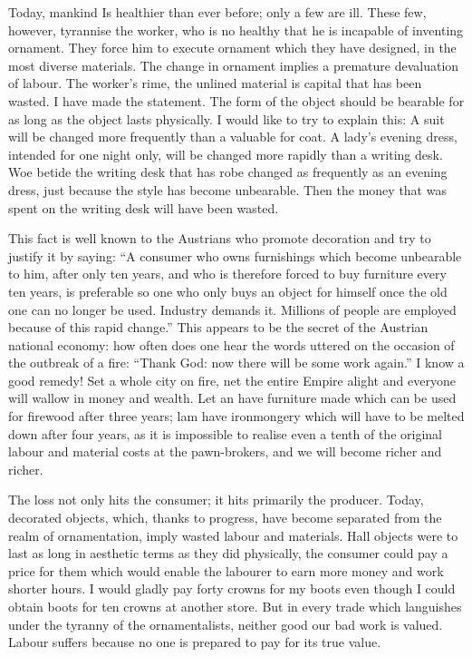 \documentclass[a4paper]{article}
\begin{document}
Today, mankind Is healthier than ever before; only a few are ill. These few, however, tyrannise the worker, who is no healthy that he is incapable of inventing ornament. They force him to execute ornament which they have designed, in the most diverse materials.
The change in ornament implies a premature devaluation of labour. The worker’s rime, the unlined material is capital that has been wasted. I have made the statement. The form of the object should be bearable for as long as the object lasts physically. I would like to try to explain this: A suit will be changed more frequently than a valuable for coat. A lady’s evening dress, intended for one night only, will be changed more rapidly than a writing desk. Woe betide the writing desk that has robe changed as frequently as an evening dress, just because the style has become unbearable. Then the money that was spent on the writing desk will have been wasted.

This fact is well known to the Austrians who promote decoration and try to justify it by saying: “A consumer who owns furnishings which become unbearable to him, after only ten years, and who is therefore forced to buy furniture every ten years, is preferable so one who only buys an object for himself once the old one can no longer be used. Industry demands it. Millions of people are employed because of this rapid change.” This appears to be the secret of the Austrian national economy: how often does one hear the words uttered on the occasion of the outbreak of a fire: “Thank God: now there will be some work again.” I know a good remedy! Set a whole city on fire, net the entire Empire alight and everyone will wallow in money and wealth. Let an have furniture made which can be used for firewood after three years; lam have ironmongery which will have to be melted down after four years, as it is impossible to realise even a tenth of the original labour and material costs at the pawn-brokers, and we will become richer and richer.

The loss not only hits the consumer; it hits primarily the producer. Today, decorated objects, which, thanks to progress, have become separated from the realm of ornamentation, imply wasted labour and materials. Hall objects were to last as long in aesthetic terms as they did physically, the consumer could pay a price for them which would enable the labourer to earn more money and work shorter hours. I would gladly pay forty crowns for my boots even though I could obtain boots for ten crowns at another store. But in every trade which languishes under the tyranny of the ornamentalists, neither good our bad work is valued. Labour suffers because no one is prepared to pay for its true value.
\end{document}
